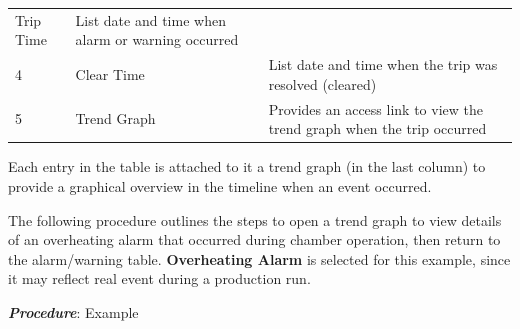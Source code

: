 \begin{longtable}[]{@{}|l|l|l|@{}}
\begin{minipage}[t]{0.23\columnwidth}
Trip Time\strut
\end{minipage} & \begin{minipage}[t]{0.65\columnwidth}\raggedright
List date and time when alarm or warning occurred\strut
\end{minipage}\tabularnewline
\begin{minipage}[t]{0.04\columnwidth}\raggedright
4\strut
\end{minipage} & \begin{minipage}[t]{0.23\columnwidth}\raggedright
Clear Time\strut
\end{minipage} & \begin{minipage}[t]{0.65\columnwidth}\raggedright
List date and time when the trip was resolved (cleared)\strut
\end{minipage}\tabularnewline
\begin{minipage}[t]{0.04\columnwidth}\raggedright
5\strut
\end{minipage} & \begin{minipage}[t]{0.23\columnwidth}\raggedright
Trend Graph\strut
\end{minipage} & \begin{minipage}[t]{0.65\columnwidth}\raggedright
Provides an access link to view the trend graph when the trip
occurred\strut
\end{minipage}\tabularnewline
\bottomrule
\end{longtable}

Each entry in the table is attached to it a trend graph (in the last
column) to provide a graphical overview in the timeline when an event
occurred.

The following procedure outlines the steps to open a trend graph to view
details of an overheating alarm that occurred during chamber operation,
then return to the alarm/warning table. \textbf{Overheating Alarm} is
selected for this example, since it may reflect real event during a
production run.

\pagebreak
\textbf{\emph{Procedure}}: Example

